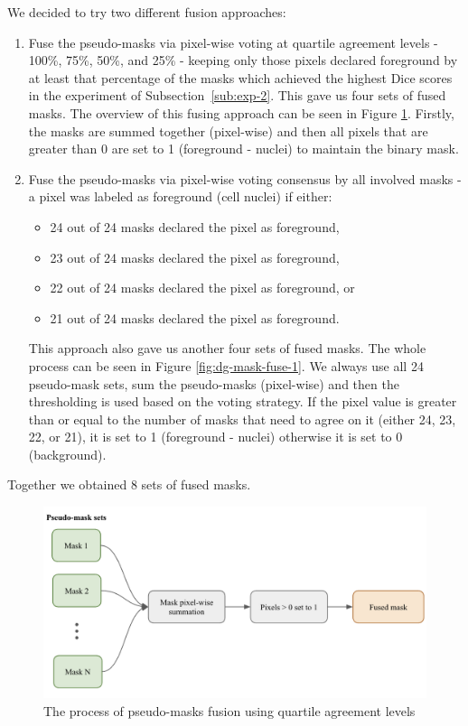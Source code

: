 We decided to try two different fusion approaches:

\begin{enumerate}
  \item Fuse the pseudo-masks via pixel-wise voting at quartile agreement levels - 100\%, 75\%, 50\%, and 25\% - keeping only those pixels declared foreground by at least that percentage of the masks which achieved the highest Dice scores in the experiment of Subsection~\ref{sub:exp-2}. This gave us four sets of fused masks. The overview of this fusing approach can be seen in Figure \ref{fig:dg-mask-fuse-2}. Firstly, the masks are summed together (pixel-wise) and then all pixels that are greater than 0 are set to 1 (foreground - nuclei) to maintain the binary mask.
  \item Fuse the pseudo-masks via pixel-wise voting consensus by all involved masks - a pixel was labeled as foreground (cell nuclei) if either:
  \begin{itemize}
      \item 24 out of 24 masks declared the pixel as foreground,
      \item 23 out of 24 masks declared the pixel as foreground,
      \item 22 out of 24 masks declared the pixel as foreground, or
      \item 21 out of 24 masks declared the pixel as foreground.
  \end{itemize}
  This approach also gave us another four sets of fused masks. The whole process can be seen in Figure \ref{fig:dg-mask-fuse-1}. We always use all 24 pseudo-mask sets, sum the pseudo-masks (pixel-wise) and then the thresholding is used based on the voting strategy. If the pixel value is greater than or equal to the number of masks that need to agree on it (either 24, 23, 22, or 21), it is set to 1 (foreground - nuclei) otherwise it is set to 0 (background).
\end{enumerate}

Together we obtained 8 sets of fused masks.

\begin{figure}[H]
\begin{centering}
\includegraphics[width=\textwidth]{assets/images/for_presentation/dg-mask-fuse-2.png}
\par\end{centering}
\caption{The process of pseudo-masks fusion using quartile agreement levels
\label{fig:dg-mask-fuse-2}}
\end{figure}

